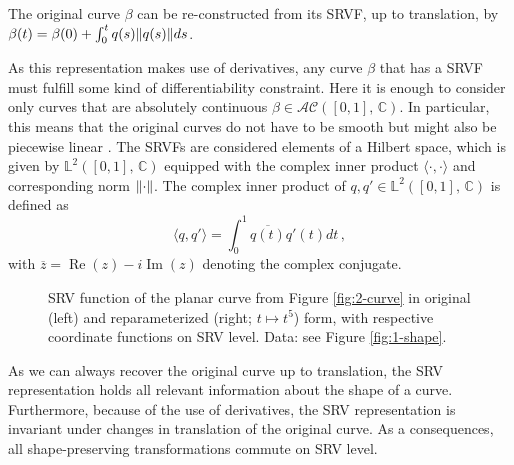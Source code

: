 \begin{remark}
The original curve $\beta$ can be re-constructed from its SRVF, up to translation, by $\beta(t) = \beta(0) + \int_0^t q(s) \lVert q(s)\rVert ds$.
\end{remark}
As this representation makes use of derivatives, any curve $\beta$ that has a SRVF must fulfill some kind of differentiability constraint.
Here it is enough to consider only curves that are absolutely continuous $\beta \in \mathcal{AC}([0,1],\, \mathbb{C})$.
In particular, this means that the original curves do not have to be smooth but might also be piecewise linear \parencite[see][91]{SrivastavaKlassen2016}.
The SRVFs are considered elements of a Hilbert space, which is given by $\mathbb{L}^2([0,1],\,\mathbb{C})$ equipped with the complex inner product $\langle \cdot, \cdot \rangle$ and corresponding norm $\lVert\cdot\rVert$.
The complex inner product of $q,q' \in \mathbb{L}^2([0,1],\,\mathbb{C})$ is defined as
$$ \langle q, q' \rangle = \int_0^1 \overline{q(t)} q'(t) dt \,, $$
with $\overline{z} = \operatorname{Re}(z) - i \operatorname{Im}(z)$ denoting the complex conjugate.

\begin{figure}
  \centering
  \begin{subfigure}{.48\textwidth}
    \centering
  \end{subfigure}\hfill%
  \begin{subfigure}{.48\textwidth}
    \centering
  \end{subfigure}
  \caption{SRV function of the planar curve from Figure \ref{fig:2-curve} in original (left) and reparameterized (right; $t \mapsto t^5$) form, with respective coordinate functions on SRV level. Data: see Figure \ref{fig:1-shape}.}
  \label{fig:2-srv}
\end{figure}

As we can always recover the original curve up to translation, the SRV representation holds all relevant information about the shape of a curve.
Furthermore, because of the use of derivatives, the SRV representation is invariant under changes in translation of the original curve.
As a consequences, all shape-preserving transformations commute on SRV level.

